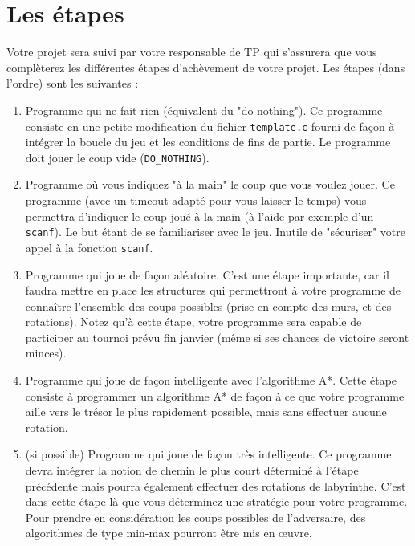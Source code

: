 \documentclass[french,12pt,a4paper,twoside,openright,titlepage]{report}
\begin{document}
\section{Les étapes}
Votre projet sera suivi par votre responsable de TP qui s'assurera que vous complèterez les différentes étapes d'achèvement de votre projet. Les étapes (dans l'ordre) sont les suivantes : 
\begin{enumerate}
 \item Programme qui ne fait rien (équivalent du "do nothing"). Ce programme consiste en une petite modification du fichier \verb|template.c| fourni de façon à intégrer la boucle du jeu et les conditions de fins de partie. Le programme doit jouer le coup vide (\verb|DO_NOTHING|).
 \item Programme où vous indiquez "à la main" le coup que vous voulez jouer. Ce programme (avec un timeout adapté pour vous laisser le temps) vous permettra d'indiquer le coup joué à la main (à l'aide par exemple d'un \verb|scanf|). Le but étant de se familiariser avec le jeu. Inutile de "sécuriser" votre appel à la fonction \verb|scanf|.
 \item Programme qui joue de façon aléatoire. C'est une étape importante, car il faudra mettre en place les structures qui permettront à votre programme de connaître l'ensemble des coups possibles (prise en compte des murs, et des rotations). Notez qu'à cette étape, votre programme sera capable de participer au tournoi prévu fin janvier (même si ses chances de victoire seront minces).
 \item Programme qui joue de façon intelligente avec l'algorithme A*. Cette étape consiste à programmer un algorithme A*
 de façon à ce que votre programme aille vers le trésor le plus rapidement possible, mais sans effectuer aucune rotation.
 \item (si possible) Programme qui joue de façon très intelligente. Ce programme devra intégrer la notion de chemin le plus court déterminé à l'étape précédente mais pourra également effectuer des rotations de labyrinthe. C'est dans cette étape là que vous déterminez une stratégie pour votre programme.\\
 Pour prendre en considération les coups possibles de l'adversaire, des algorithmes de type min-max pourront être mis en \oe uvre.
 \end{enumerate}
\end{document}
